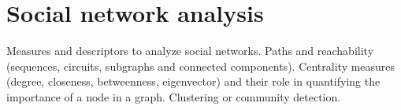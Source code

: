 \section{Social network analysis}
\label{sec:sna}

Measures and descriptors to analyze social networks. Paths and reachability (sequences, circuits, subgraphs and connected components). Centrality measures (degree, closeness, betweenness, eigenvector) and their role in quantifying the importance of a node in a graph.  Clustering or community detection.
